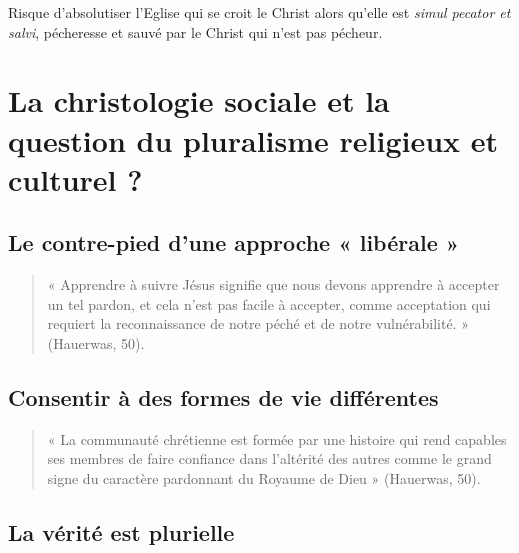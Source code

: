 Risque d'absolutiser l'Eglise qui se croit le Christ alors qu'elle est \textit{simul pecator et salvi}, pécheresse et sauvé par le Christ qui n'est pas pécheur.





\section{La christologie sociale et la question du pluralisme religieux et culturel ?}

\subsection{Le contre-pied d’une approche « libérale »}

\begin{quote}
    « Apprendre à suivre Jésus signifie que nous devons apprendre à accepter un tel pardon, et cela n’est
pas facile à accepter, comme acceptation qui requiert la reconnaissance de notre péché et de notre
vulnérabilité. » (Hauerwas, 50).
\end{quote}
\subsection{Consentir à des formes de vie différentes} 
\begin{quote}
    « La communauté chrétienne est formée par une histoire qui rend capables ses membres de faire
confiance dans l’altérité des autres comme le grand signe du caractère pardonnant du Royaume de
Dieu » (Hauerwas, 50).
\end{quote}

\subsection{La vérité est plurielle} 

